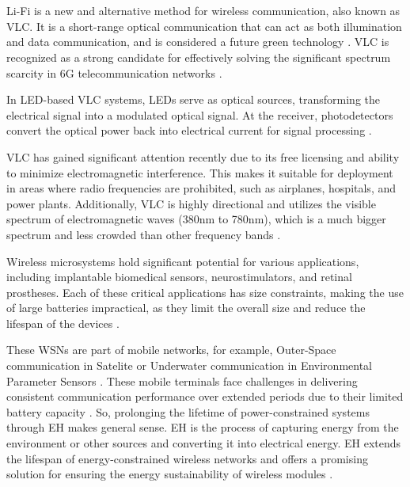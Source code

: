 \chapter{}

\ac{Li-Fi} is a new and alternative method for wireless communication, also known as \ac{VLC}. It is a short-range optical communication that can act as both illumination and data communication, and is considered a future green technology \cite{7420990} \cite{7292748}. \ac{VLC} is recognized as a strong candidate for effectively solving the significant spectrum scarcity in 6G telecommunication networks \cite{ding2024performance}.

In LED-based \ac{VLC} systems, LEDs serve as optical sources, transforming the electrical signal into a modulated optical signal. At the receiver, photodetectors convert the optical power back into electrical current for signal processing \cite{fuada2016trans}.

\ac{VLC} has gained significant attention recently due to its free licensing and ability to minimize electromagnetic interference. This makes it suitable for deployment in areas where radio frequencies are prohibited, such as airplanes, hospitals, and power plants. Additionally, \ac{VLC} is highly directional and utilizes the visible spectrum of electromagnetic waves (380nm to 780nm), which is a much bigger spectrum and less crowded than other frequency bands \cite{liu2016visible}.

Wireless microsystems hold significant potential for various applications, including implantable biomedical sensors, neurostimulators, and retinal prostheses. Each of these critical applications has size constraints, making the use of large batteries impractical, as they limit the overall size and reduce the lifespan of the devices \cite{haydaroglu2014optical} \cite{7292748}.

These \ac{WSNs} are part of mobile networks, for example, Outer-Space communication in Satelite or Underwater communication in Environmental Parameter Sensors \cite{de2024reconfigurable}\cite{7292748}. These mobile terminals face challenges in delivering consistent communication performance over extended periods due to their limited battery capacity \cite{ding2024performance}\cite{tudose2011energy}. So, prolonging the lifetime of power-constrained systems through \ac{EH} makes general sense. \ac{EH} is the process of capturing energy from the environment or other sources and converting it into electrical energy. \ac{EH} extends the lifespan of energy-constrained wireless networks and offers a promising solution for ensuring the energy sustainability of wireless modules \cite{diamantoulakis2018simultaneous}.

